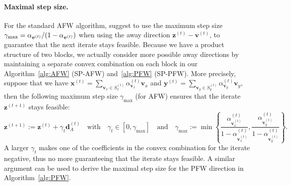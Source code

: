 \documentclass[twoside]{article}
\newcommand{\z}{\bm{z}}
\newcommand{\xt}{\bm{x}^{(t)}}
\newcommand{\zt}{\bm{z}^{(t)}}
\newcommand{\ztt}{\bm {z}^{(t+1)}}
\newcommand{\vt}{\bm{v}^{(t)}}
\newcommand{\dt}{\bm{d}^{(t)}}
\newcommand{\yt}{\bm{y}^{(t)}}
\newcommand{\stepsize}{\gamma}
\newcommand{\stepmax}{\stepsize_{\textnormal{\scriptsize max}}} %
\newcommand{\vv}{\bm{v}} %
\newcommand{\0}{\mathbf{0}} %
\begin{document}
  \paragraph{Maximal step size.} %
  \label{par:maximal_step size}
 For the standard AFW algorithm,  
 \citet{lacoste2015global} suggest to use the maximum step size $\stepmax = \alpha_{\vv^{(t)}}/(1- \alpha_{\vv^{(t)}})$ when using the away direction $\z^{(t)}-\vv^{(t)}$, to guarantee that the next iterate stays feasible. Because we have a product structure of two blocks, we actually consider more possible away directions by maintaining a separate convex combination on each block in our Algorithm~\ref{alg:AFW} (SP-AFW) and~\ref{alg:PFW} (SP-PFW). More precisely, suppose that we have $\xt = \sum_{\vv_x \in S^{(t)}_x} \alpha^{(t)}_{\vv_x} \vv_x$ and $\yt = \sum_{\vv_y \in S^{(t)}_y} \alpha^{(t)}_{\vv_y} \vv_y$, then the following maximum step size $\gamma_{\max}$ (for AFW) ensures that the iterate $\ztt$ stays feasible:
   \begin{equation} \label{eq:update}
    \ztt := \zt + \gamma_t  \dt_A 
    \quad \text{with} \quad \gamma_t \in [0,\gamma_{\max}]
    \quad \text{and} \quad
     \gamma_{\max} := \min\left\{\frac{\alpha^{(t)}_{\vt_x}}{1 -\alpha^{(t)}_{\vt_x}},\frac{\alpha^{(t)}_{\vt_y}}{1 -\alpha^{(t)}_{\vt_y}} \right\}.
    \end{equation}
    A larger $\stepsize_t$ makes one of the coefficients in the convex combination for the iterate negative, thus no more guaranteeing that the iterate stays feasible. A similar argument can be used to derive the maximal step size for the PFW direction in Algorithm~\ref{alg:PFW}.
\end{document}

